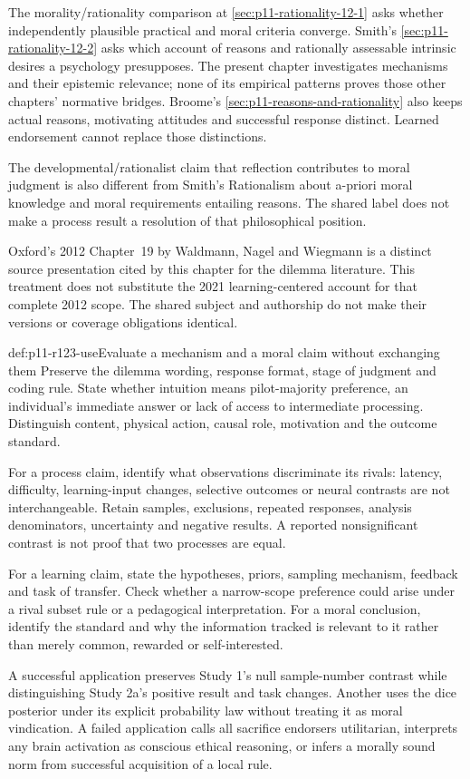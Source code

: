 The morality/rationality comparison at \cref{sec:p11-rationality-12-1}
asks whether independently plausible practical and moral criteria converge.
Smith's \cref{sec:p11-rationality-12-2} asks which account of reasons and
rationally assessable intrinsic desires a psychology presupposes. The
present chapter investigates mechanisms and their epistemic relevance;
none of its empirical patterns proves those other chapters' normative
bridges. Broome's \cref{sec:p11-reasons-and-rationality} also keeps actual
reasons, motivating attitudes and successful response distinct. Learned
endorsement cannot replace those distinctions.

The developmental/rationalist claim that reflection contributes to moral
judgment is also different from Smith's Rationalism about a-priori moral
knowledge and moral requirements entailing reasons. The shared label
does not make a process result a resolution of that philosophical position.

Oxford's 2012 Chapter~19 by Waldmann, Nagel and Wiegmann is a distinct
source presentation cited by this chapter for the dilemma literature.
This treatment does not substitute the 2021 learning-centered account
for that complete 2012 scope. The shared subject and authorship do not
make their versions or coverage obligations identical.

\begin{hbmethod}{def:p11-r123-use}{Evaluate a mechanism and a moral claim without exchanging them}
Preserve the dilemma wording, response format, stage of judgment and
coding rule. State whether intuition means pilot-majority preference,
an individual's immediate answer or lack of access to intermediate
processing. Distinguish content, physical action, causal role, motivation
and the outcome standard.

For a process claim, identify what observations discriminate its rivals:
latency, difficulty, learning-input changes, selective outcomes or neural
contrasts are not interchangeable. Retain samples, exclusions, repeated
responses, analysis denominators, uncertainty and negative results. A
reported nonsignificant contrast is not proof that two processes are equal.

For a learning claim, state the hypotheses, priors, sampling mechanism,
feedback and task of transfer. Check whether a narrow-scope preference
could arise under a rival subset rule or a pedagogical interpretation.
For a moral conclusion, identify the standard and why the information
tracked is relevant to it rather than merely common, rewarded or
self-interested.

A successful application preserves Study 1's null sample-number contrast
while distinguishing Study 2a's positive result and task changes. Another
uses the dice posterior under its explicit probability law without treating
it as moral vindication. A failed application calls all sacrifice endorsers
utilitarian, interprets any brain activation as conscious ethical reasoning,
or infers a morally sound norm from successful acquisition of a local rule.
\end{hbmethod}

